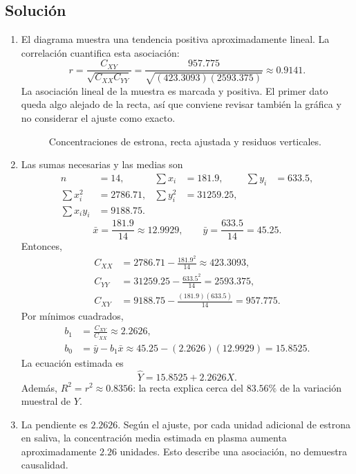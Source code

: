 \subsection*{Solución}
\begin{enumerate}
    \item[\textbf{a)}] El diagrama muestra una tendencia positiva aproximadamente lineal. La correlación cuantifica esta asociación:
    \[
    r=\frac{C_{XY}}{\sqrt{C_{XX}C_{YY}}}
    =\frac{957.775}{\sqrt{(423.3093)(2593.375)}}\approx0.9141.
    \]
    La asociación lineal de la muestra es marcada y positiva. El primer dato queda algo alejado de la recta, así que conviene revisar también la gráfica y no considerar el ajuste como exacto.
    \begin{figure}[H]
    \centering
    
    \caption{Concentraciones de estrona, recta ajustada y residuos verticales.}
    \label{fig:clase5-estrona}
    \end{figure}

    \item[\textbf{b)}] Las sumas necesarias y las medias son
    \begin{align*}
    n&=14,& \sum x_i&=181.9,& \sum y_i&=633.5,\\
    \sum x_i^2&=2786.71,& \sum y_i^2&=31259.25,\\
    \sum x_iy_i&=9188.75.
    \end{align*}
    \[
    \bar x=\frac{181.9}{14}\approx12.9929,\qquad \bar y=\frac{633.5}{14}=45.25.
    \]
    Entonces,
    \begin{align*}
    C_{XX}&=2786.71-\frac{181.9^2}{14}\approx423.3093,\\
    C_{YY}&=31259.25-\frac{633.5^2}{14}=2593.375,\\
    C_{XY}&=9188.75-\frac{(181.9)(633.5)}{14}=957.775.
    \end{align*}
    Por mínimos cuadrados,
    \begin{align*}
    b_1&=\frac{C_{XY}}{C_{XX}}\approx2.2626,\\
    b_0&=\bar y-b_1\bar x\approx45.25-(2.2626)(12.9929)=15.8525.
    \end{align*}
    La ecuación estimada es
    \[
    \boxed{\widehat Y=15.8525+2.2626X.}
    \]
    Además, $R^2=r^2\approx0.8356$: la recta explica cerca del $83.56\%$ de la variación muestral de $Y$.

    \item[\textbf{c)}] La pendiente es $2.2626$. Según el ajuste, por cada unidad adicional de estrona en saliva, la concentración media estimada en plasma aumenta aproximadamente $2.26$ unidades. Esto describe una asociación, no demuestra causalidad.
\end{enumerate}

